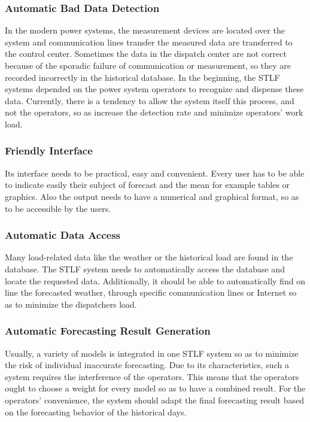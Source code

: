 \subsubsection{Automatic Bad Data Detection}
In the modern power systems, the measurement devices are located over the system and communication lines transfer the measured data are transferred to the control center.  Sometimes the data in the dispatch center are not correct because of the sporadic failure of communication or measurement, so they are recorded incorrectly in the historical database. In the beginning, the STLF systems depended on the power system operators to recognize and dispense these data. Currently, there is a tendency to allow the system itself this process, and not the operators, so as increase the detection rate and minimize operators’ work load. 
\subsubsection{Friendly Interface}
Its interface needs to be practical, easy and convenient. Every user has to be able to indicate easily their subject of forecast and the mean for example tables or graphics. Also the output needs to have a numerical and graphical format, so as to be accessible by the users.

\subsubsection{Automatic Data Access}
Many load-related data like the weather or the historical load are found in the database. The STLF system needs to automatically access the database and locate the requested data. Additionally, it should be able to automatically find on line the forecasted weather, through specific communication lines or Internet so as to minimize the dispatchers load. 

\subsubsection{Automatic Forecasting Result Generation}
Usually, a variety of models is integrated in one STLF system so as to minimize the risk of individual inaccurate forecasting. Due to its characteristics, such a system requires the interference of the operators. This means that the operators ought to choose a weight for every model so as to have a combined result. For the operators’ convenience, the system should adapt the final forecasting result based on the forecasting behavior of the historical days.

